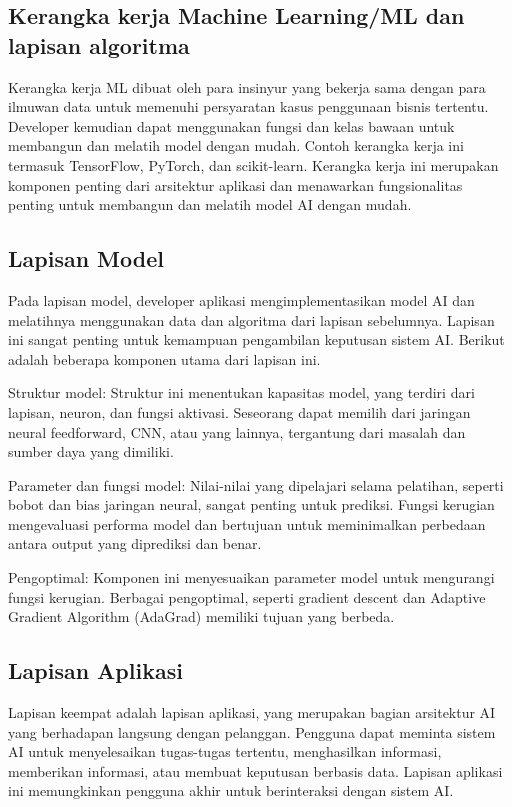 \subsection{Kerangka kerja Machine Learning/ML dan lapisan algoritma}
Kerangka kerja ML dibuat oleh para insinyur yang bekerja sama dengan para ilmuwan data untuk memenuhi persyaratan kasus penggunaan bisnis tertentu. Developer kemudian dapat menggunakan fungsi dan kelas bawaan untuk membangun dan melatih model dengan mudah. Contoh kerangka kerja ini termasuk TensorFlow, PyTorch, dan scikit-learn. Kerangka kerja ini merupakan komponen penting dari arsitektur aplikasi dan menawarkan fungsionalitas penting untuk membangun dan melatih model AI dengan mudah.

\subsection{Lapisan Model}
Pada lapisan model, developer aplikasi mengimplementasikan model AI dan melatihnya menggunakan data dan algoritma dari lapisan sebelumnya. Lapisan ini sangat penting untuk kemampuan pengambilan keputusan sistem AI. Berikut adalah beberapa komponen utama dari lapisan ini.
\begin{packed_item}
	\item Struktur model: Struktur ini menentukan kapasitas model, yang terdiri dari lapisan, neuron, dan fungsi aktivasi. Seseorang dapat memilih dari jaringan neural feedforward, CNN, atau yang lainnya, tergantung dari masalah dan sumber daya yang dimiliki.
	\item Parameter dan fungsi model: Nilai-nilai yang dipelajari selama pelatihan, seperti bobot dan bias jaringan neural, sangat penting untuk prediksi. Fungsi kerugian mengevaluasi performa model dan bertujuan untuk meminimalkan perbedaan antara output yang diprediksi dan benar.
	\item Pengoptimal: Komponen ini menyesuaikan parameter model untuk mengurangi fungsi kerugian. Berbagai pengoptimal, seperti gradient descent dan Adaptive Gradient Algorithm (AdaGrad) memiliki tujuan yang berbeda.
\end{packed_item}

\subsection{Lapisan Aplikasi}
Lapisan keempat adalah lapisan aplikasi, yang merupakan bagian arsitektur AI yang berhadapan langsung dengan pelanggan. Pengguna dapat meminta sistem AI untuk menyelesaikan tugas-tugas tertentu, menghasilkan informasi, memberikan informasi, atau membuat keputusan berbasis data. Lapisan aplikasi ini memungkinkan pengguna akhir untuk berinteraksi dengan sistem AI.

